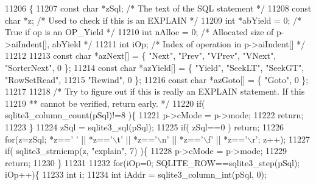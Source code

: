 \begin{DoxyCode}
11206                                                                    \{
11207   \textcolor{keyword}{const} \textcolor{keywordtype}{char} *zSql;               \textcolor{comment}{/* The text of the SQL statement */}
11208   \textcolor{keyword}{const} \textcolor{keywordtype}{char} *z;                  \textcolor{comment}{/* Used to check if this is an EXPLAIN */}
11209   \textcolor{keywordtype}{int} *abYield = 0;               \textcolor{comment}{/* True if op is an OP\_Yield */}
11210   \textcolor{keywordtype}{int} nAlloc = 0;                 \textcolor{comment}{/* Allocated size of p->aiIndent[], abYield */}
11211   \textcolor{keywordtype}{int} iOp;                        \textcolor{comment}{/* Index of operation in p->aiIndent[] */}
11212 
11213   \textcolor{keyword}{const} \textcolor{keywordtype}{char} *azNext[] = \{ \textcolor{stringliteral}{"Next"}, \textcolor{stringliteral}{"Prev"}, \textcolor{stringliteral}{"VPrev"}, \textcolor{stringliteral}{"VNext"}, \textcolor{stringliteral}{"SorterNext"}, 0 \};
11214   \textcolor{keyword}{const} \textcolor{keywordtype}{char} *azYield[] = \{ \textcolor{stringliteral}{"Yield"}, \textcolor{stringliteral}{"SeekLT"}, \textcolor{stringliteral}{"SeekGT"}, \textcolor{stringliteral}{"RowSetRead"},
11215                             \textcolor{stringliteral}{"Rewind"}, 0 \};
11216   \textcolor{keyword}{const} \textcolor{keywordtype}{char} *azGoto[] = \{ \textcolor{stringliteral}{"Goto"}, 0 \};
11217 
11218   \textcolor{comment}{/* Try to figure out if this is really an EXPLAIN statement. If this}
11219 \textcolor{comment}{  ** cannot be verified, return early.  */}
11220   \textcolor{keywordflow}{if}( sqlite3_column_count(pSql)!=8 )\{
11221     p->cMode = p->mode;
11222     \textcolor{keywordflow}{return};
11223   \}
11224   zSql = sqlite3_sql(pSql);
11225   \textcolor{keywordflow}{if}( zSql==0 ) \textcolor{keywordflow}{return};
11226   \textcolor{keywordflow}{for}(z=zSql; *z==\textcolor{charliteral}{' '} || *z==\textcolor{charliteral}{'\(\backslash\)t'} || *z==\textcolor{charliteral}{'\(\backslash\)n'} || *z==\textcolor{charliteral}{'\(\backslash\)f'} || *z==\textcolor{charliteral}{'\(\backslash\)r'}; z++);
11227   \textcolor{keywordflow}{if}( sqlite3_strnicmp(z, \textcolor{stringliteral}{"explain"}, 7) )\{
11228     p->cMode = p->mode;
11229     \textcolor{keywordflow}{return};
11230   \}
11231 
11232   \textcolor{keywordflow}{for}(iOp=0; SQLITE_ROW==sqlite3_step(pSql); iOp++)\{
11233     \textcolor{keywordtype}{int} i;
11234     \textcolor{keywordtype}{int} iAddr = sqlite3_column_int(pSql, 0);

\end{DoxyCode}
